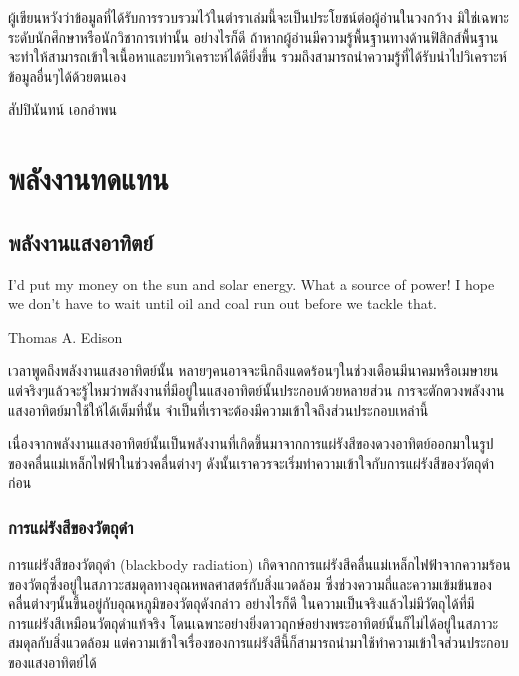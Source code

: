 \documentclass[a4paper,nobib,openany]{tufte-book}
\begin{document}
ผู้เขียนหวังว่าข้อมูลที่ได้รับการรวบรวมไว้ในตำราเล่มนี้จะเป็นประโยชน์ต่อผู้อ่านในวงกว้าง
มิใช่เฉพาะระดับนักศึกษาหรือนักวิชาการเท่านั้น อย่างไรก็ดี
ถ้าหากผู้อ่านมีความรู้พื้นฐานทางด้านฟิสิกส์พื้นฐาน
จะทำให้สามารถเข้าใจเนื้อหาและบทวิเคราะห์ได้ดียิ่งขึ้น
รวมถึงสามารถนำความรู้ที่ได้รับนำไปวิเคราะห์ข้อมูลอื่นๆได้ด้วยตนเอง

สัปปินันทน์ เอกอำพน

\tableofcontents

\listoffigures

\listoftables

\mainmatter


\part{พลังงานทดแทน}
\label{sec:orgef4a3f2}
\chapter{พลังงานแสงอาทิตย์}
\label{sec:org3cdac15}

\epigraph{I'd put my money on the sun and solar energy. What a source of power! I hope we don't have to wait until oil and coal run out before we tackle that.}{Thomas A. Edison}

เวลาพูดถึงพลังงานแสงอาทิตย์นั้น
หลายๆคนอาจจะนึกถึงแดดร้อนๆในช่วงเดือนมีนาคมหรือเมษายน
แต่จริงๆแล้วจะรู้ไหมว่าพลังงานที่มีอยู่ในแสงอาทิตย์นั้นประกอบด้วยหลายส่วน
การจะตักตวงพลังงานแสงอาทิตย์มาใช้ให้ได้เต็มที่นั้น
จำเป็นที่เราจะต้องมีความเข้าใจถึงส่วนประกอบเหล่านี้

เนื่องจากพลังงานแสงอาทิตย์นั้นเป็นพลังงานที่เกิดขึ้นมาจากการแผ่รังสีของดวงอาทิตย์ออกมาในรูปของคลื่นแม่เหล็กไฟฟ้าในช่วงคลื่นต่างๆ
ดังนั้นเราควรจะเริ่มทำความเข้าใจกับการแผ่รังสีของวัตถุดำก่อน

\section{การแผ่รังสีของวัตถุดำ}
\label{sec:org78991d6}

การแผ่รังสีของวัตถุดำ (blackbody radiation) เกิดจากการแผ่รังสีคลื่นแม่เหล็กไฟฟ้าจากความร้อนของวัตถุซึ่งอยู่ในสภาวะสมดุลทางอุณหพลศาสตร์กับสิ่งแวดล้อม
ซึ่งช่วงความถี่และความเข้มข้นของคลื่นต่างๆนั้นขึ้นอยู่กับอุณหภูมิของวัตถุดังกล่าว
อย่างไรก็ดี
ในความเป็นจริงแล้วไม่มีวัตถุได้ที่มีการแผ่รังสีเหมือนวัตถุดำแท้จริง
โดนเฉพาะอย่างยิ่งดาวฤกษ์อย่างพระอาทิตย์นั้นก็ไม่ได้อยู่ในสภาวะสมดุลกับสิ่งแวดล้อม
แต่ความเข้าใจเรื่องของการแผ่รังสีนี้ก็สามารถนำมาใช้ทำความเข้าใจส่วนประกอบของแสงอาทิตย์ได้
\end{document}
